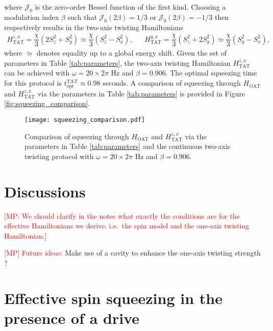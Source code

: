 \documentclass[aps,notitlepage,nofootinbib,11pt]{revtex4-1}
\renewcommand{\t}{\text} %
\newcommand{\f}[2]{\dfrac{#1}{#2}} %
\newcommand{\p}[1]{\left(#1\right)} %
\newcommand{\J}{\mathcal{J}}
\newcommand{\1}{\hat{\mathds{1}}}
\newcommand{\note}[1]{\textcolor{red}{#1}}
\begin{document}
where $\J_0$ is the zero-order Bessel function of the first kind.
Choosing a modulation index $\beta$ such that $\J_0\p{2\beta}=1/3$ or
$\J_0\p{2\beta}=-1/3$ then respectively results in the two-axis
twisting Hamiltonians
\begin{align}
  H_{\t{TAT}}^{z,x}
  = \f{\chi}{3} \p{2 S_z^2 + S_y^2}
  \simeq \f{\chi}{3} \p{S_z^2 - S_x^2},
  &&
  H_{\t{TAT}}^{y,x}
  = \f{\chi}{3} \p{S_z^2 + 2 S_y^2}
  \simeq \f{\chi}{3}\p{S_y^2 - S_x^2},
  \label{eq:H_TAT_drive}
\end{align}
where $\simeq$ denotes equality up to a global energy shift. Given the
set of parameters in Table \ref{tab:parameters}, the two-axis twisting
Hamiltonian $H_{\t{TAT}}^{z,x}$ can be achieved with
$\omega=20\times2\pi$ Hz and $\beta=0.906$.  The optimal squeezing
time for this protocol is $t_{\t{opt}}^{\t{TAT}}\approx0.98$ seconds.
A comparison of squeezing through $H_{\t{OAT}}$ and
$H_{\t{TAT}}^{z,x}$ via the parameters in Table \ref{tab:parameters}
is provided in Figure \ref{fig:squeezing_comparison}.

\begin{figure}[h]
  \centering
  \texttt{[image: squeezing\_comparison.pdf]}
  \caption{Comparison of squeezing through $H_{\t{OAT}}$ and
    $H_{\t{TAT}}^{z,x}$ via the parameters in Table
    \ref{tab:parameters} and the continuous two-axis twisting protocol
    with $\omega=20\times2\pi$ Hz and $\beta=0.906$.}
  \label{fig:parameters}
\end{figure}


\section{Discussions}

\note{[MP: We should clarify in the notes what exactly the conditions
  are for the effective Hamiltonians we derive, i.e.~the spin model
  and the one-axis twisting Hamiltonian.]}

\note{[MP] Future ideas:} Make use of a cavity to enhance the one-axis
twisting strength \cite{hu2017vacuum}?


\appendix

\section{Effective spin squeezing in the presence of a drive}
\label{sec:effective_squeezing_drive}
\end{document}
